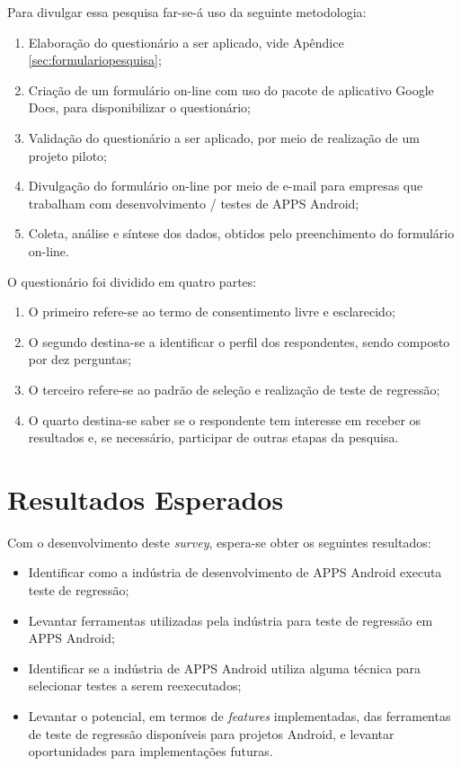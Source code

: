 Para divulgar essa pesquisa far-se-á uso da seguinte metodologia:

\begin{enumerate}
    \item Elaboração do questionário a ser aplicado, vide Apêndice \ref{sec:formulariopesquisa};
    \item Criação de um formulário on-line com uso do pacote de aplicativo Google Docs, para disponibilizar o questionário;
    \item Validação do questionário a ser aplicado, por meio de realização de um projeto piloto;
    \item Divulgação do formulário on-line por meio de e-mail para empresas que trabalham com desenvolvimento / testes de \ac{APPS} Android;
    \item Coleta, análise e síntese dos dados, obtidos pelo preenchimento do formulário on-line.
\end{enumerate}


O questionário foi dividido em quatro partes:

\begin{enumerate}
    \item O primeiro refere-se ao termo de consentimento livre e esclarecido;
    \item O segundo destina-se a identificar o perfil dos respondentes, sendo composto por dez perguntas;
    \item O terceiro refere-se ao padrão de seleção e realização de teste de regressão;
    \item O quarto destina-se saber se o respondente tem interesse em receber os resultados e, se necessário, participar de outras etapas da pesquisa.
\end{enumerate}


\section{Resultados Esperados}

Com o desenvolvimento deste \textit{survey}, espera-se obter os seguintes resultados:

\begin{itemize}
    \item Identificar como a indústria de desenvolvimento de \ac{APPS} Android executa teste de regressão;
    \item Levantar ferramentas utilizadas pela indústria para teste de regressão em \ac{APPS} Android;
    \item Identificar se a indústria de \ac{APPS} Android utiliza alguma técnica para selecionar testes a serem reexecutados;
    \item Levantar o potencial, em termos de \textit{features} implementadas, das ferramentas de teste de regressão disponíveis para projetos Android, e levantar oportunidades para implementações futuras.
\end{itemize}


